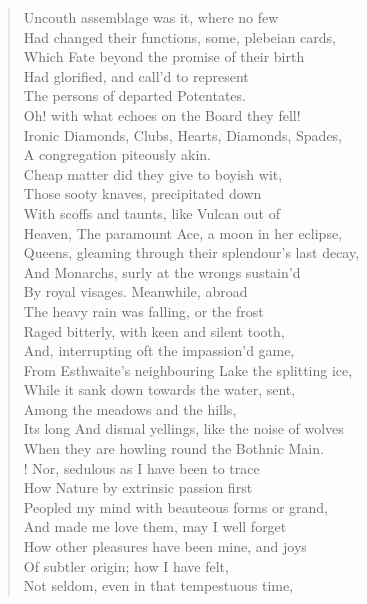\begin{verse}
Uncouth assemblage was it, where no few  \\
Had changed their functions, some, plebeian cards,  \\
Which Fate beyond the promise of their birth  \\
Had glorified, and call'd to represent	  \\
The persons of departed Potentates.  \\
Oh! with what echoes on the Board they fell!  \\
Ironic Diamonds, Clubs, Hearts, Diamonds, Spades,  \\
A congregation piteously akin.  \\
Cheap matter did they give to boyish wit,	  \\
Those sooty knaves, precipitated down  \\
With scoffs and taunts, like Vulcan out of  \\
Heaven, The paramount Ace, a moon in her eclipse,  \\
Queens, gleaming through their splendour's last decay,  \\
And Monarchs, surly at the wrongs sustain'd	  \\
By royal visages. Meanwhile, abroad  \\
The heavy rain was falling, or the frost  \\
Raged bitterly, with keen and silent tooth,  \\
And, interrupting oft the impassion'd game,  \\
From Esthwaite's neighbouring Lake the splitting ice,	  \\
While it sank down towards the water, sent,  \\
Among the meadows and the hills,  \\
Its long And dismal yellings, like the noise of wolves  \\
When they are howling round the Bothnic Main.  \\!
Nor, sedulous as I have been to trace	  \\
How Nature by extrinsic passion first  \\
Peopled my mind with beauteous forms or grand,  \\
And made me love them, may I well forget  \\
How other pleasures have been mine, and joys  \\
Of subtler origin; how I have felt,	  \\
Not seldom, even in that tempestuous time,  \\

\end{verse}
